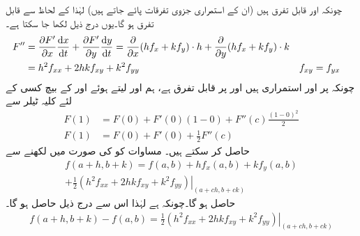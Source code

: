 چونکہ  اور   قابل تفرق   ہیں (ان کے استمراری جزوی تفرقات پائے جاتے ہیں)     لہٰذا  کے لحاظ سے  قابل تفرق ہو گا۔یوں درج ذیل لکھا جا سکتا ہے۔
\begin{align*}
F''&=\frac{\partial F'}{\partial x}\frac{\dif x}{\dif t}+\frac{\partial F'}{\partial y}\frac{\dif y}{\dif t}=\frac{\partial}{\partial x}(hf_x+kf_y)\cdot h+\frac{\partial}{\partial y}(hf_x+kf_y)\cdot k\\
&=h^2f_{xx}+2hkf_{xy}+k^2f_{yy}&&f_{xy}=f_{yx}
\end{align*} 
چونکہ  پر  اور  استمراری ہیں اور  پر  قابل تفرق ہے، ہم  اور  لیتے ہوئے    اور  کے بیچ کسی  کے لئے کلیہ ٹیلر سے
\begin{align}
F(1)&=F(0)+F'(0)(1-0)+F''(c)\frac{(1-0)^2}{2}\nonumber\\
F(1)&=F(0)+F'(0)+\frac{1}{2}F''(c)\label{مساوات_کثیرالمتغیر_ٹیلر_الف}
\end{align}
 حاصل کر سکتے ہیں۔ مساوات  کو  کی صورت میں لکھنے سے
\begin{multline}\label{مساوات_کثیرالمتغیر_ٹیلر_ب}
f(a+h,b+k)=f(a,b)+hf_x(a,b)+kf_y(a,b)\\
+\left.\frac{1}{2}(h^2f_{xx}+2hkf_{xy}+k^2f_{yy})\right\vert_{(a+ch,b+ck)}
\end{multline}
حاصل ہو گا۔چونکہ  ہے  لہٰذا اس سے درج ذیل حاصل ہو گا۔
\begin{align}\label{مساوات_کثیرالمتغیر_ٹیلر_پ}
f(a+h,b+k)-f(a,b)=\left.\frac{1}{2}(h^2f_{xx}+2hkf_{xy}+k^2f_{yy})\right\vert_{(a+ch,b+ck)}
\end{align}

